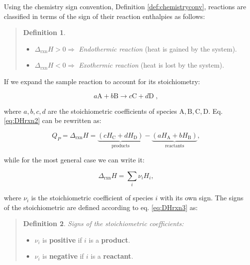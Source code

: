\documentclass[
  9pt,
]{extbook}
\providecommand{\tightlist}{%
  \setlength{\itemsep}{0pt}\setlength{\parskip}{0pt}}
\theoremstyle{definition}
\newtheorem{definition}{Definition}[chapter]
\theoremstyle{definition}
\theoremstyle{definition}
\theoremstyle{remark}
\begin{document}
Using the chemistry sign convention, Definition \ref{def:chemistryconv}, reactions are classified in terms of the sign of their reaction enthalpies as follows:

\begin{quote}
\begin{definition}
\protect\hypertarget{def:exoendo}{}{\label{def:exoendo} }\(\;\)

\begin{itemize}
\tightlist
\item
  \(\Delta_{\text{rxn}} H > 0 \Rightarrow\) \emph{Endothermic reaction} (heat is gained by the system).
\item
  \(\Delta_{\text{rxn}} H < 0 \Rightarrow\) \emph{Exothermic reaction} (heat is lost by the system).
\end{itemize}
\end{definition}
\end{quote}

If we expand the sample reaction to account for its stoichiometry:

\[ a\mathrm{A} + b\mathrm{B} \rightarrow c\mathrm{C} + d\mathrm{D}\; , \]

where \(a,b,c,d\) are the stoichiometric coefficients of species \(\mathrm{A,B,C,D}\). Eq. \eqref{eq:DHrxn2} can be rewritten as:

\begin{equation}
  Q_P = \Delta_{\text{rxn}} H = \underbrace{\left( cH_{\mathrm{C}}+dH_{\mathrm{D}} \right) }_{\text{products}} - \underbrace{ \left( aH_{\mathrm{A}}+bH_{\mathrm{B}} \right)}_{\text{reactants}},
  \label{eq:DHrxn3}
\end{equation}

while for the most general case we can write it:

\begin{equation}
  \Delta_{\text{rxn}} H = \sum_i \nu_i H_i,
  \label{eq:DHrxn4}
\end{equation}

where \(\nu_i\) is the stoichiometric coefficient of species \(i\) with its own sign. The signs of the stoichiometric are defined according to eq. \eqref{eq:DHrxn3} as:

\begin{quote}
\begin{definition}
\protect\hypertarget{def:nui}{}{\label{def:nui} }\emph{Signs of the stoichiometric coefficients:}

\begin{itemize}
\tightlist
\item
  \(\nu_i\) is \textbf{positive} if \(i\) is a \textbf{product}.
\item
  \(\nu_i\) is \textbf{negative} if \(i\) is a \textbf{reactant}.
\end{itemize}
\end{definition}
\end{quote}
\end{document}
